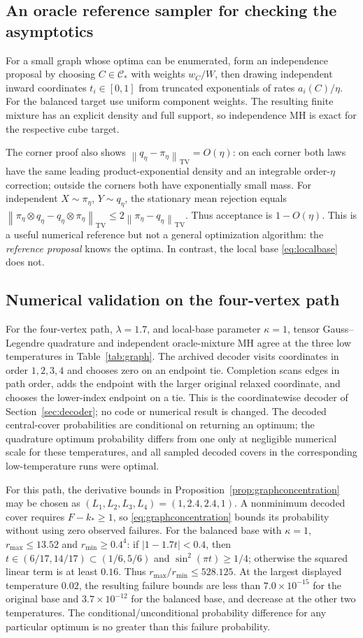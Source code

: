 \documentclass[11pt]{article}
\theoremstyle{definition}\newtheorem{definition}[theorem]{Definition}
\theoremstyle{remark}\newtheorem{remark}[theorem]{Remark}
\numberwithin{equation}{section}
\newcommand{\norm}[1]{\left\lVert#1\right\rVert}\newcommand{\TV}{\mathrm{TV}}
\newcommand{\1}{\mathbf 1}
\begin{document}
\subsection{An oracle reference sampler for checking the asymptotics}
For a small graph whose optima can be enumerated, form an independence proposal by choosing $C\in\mathcal C_*$ with weights $w_C/W$, then drawing independent inward coordinates $t_i\in[0,1]$ from truncated exponentials of rates $a_i(C)/\eta$. For the balanced target use uniform component weights. The resulting finite mixture has an explicit density and full support, so independence MH is exact for the respective cube target.

The corner proof also shows $\norm{q_\eta-\pi_\eta}_{\TV}=O(\eta)$: on each corner both laws have the same leading product-exponential density and an integrable order-$\eta$ correction; outside the corners both have exponentially small mass. For independent $X\sim\pi_\eta$, $Y\sim q_\eta$, the stationary mean rejection equals
$\norm{\pi_\eta\otimes q_\eta-q_\eta\otimes\pi_\eta}_{\TV}\le2\norm{\pi_\eta-q_\eta}_{\TV}$.
Thus acceptance is $1-O(\eta)$. This is a useful numerical reference but not a general optimization algorithm: the \emph{reference proposal} knows the optima. In contrast, the local base \eqref{eq:localbase} does not.


\subsection{Numerical validation on the four-vertex path}
For the four-vertex path, $\lambda=1.7$, and local-base parameter $\kappa=1$, tensor Gauss--Legendre quadrature and independent oracle-mixture MH agree at the three low temperatures in Table~\ref{tab:graph}. The archived decoder visits coordinates in order $1,2,3,4$ and chooses zero on an endpoint tie. Completion scans edges in path order, adds the endpoint with the larger original relaxed coordinate, and chooses the lower-index endpoint on a tie. This is the coordinatewise decoder of Section~\ref{sec:decoder}; no code or numerical result is changed. The decoded central-cover probabilities are conditional on returning an optimum; the quadrature optimum probability differs from one only at negligible numerical scale for these temperatures, and all sampled decoded covers in the corresponding low-temperature runs were optimal.

For this path, the derivative bounds in Proposition~\ref{prop:graphconcentration} may be chosen as $(L_1,L_2,L_3,L_4)=(1,2.4,2.4,1)$. A nonminimum decoded cover requires $F-k_*\ge1$, so \eqref{eq:graphconcentration} bounds its probability without using zero observed failures. For the balanced base with $\kappa=1$, $r_{\max}\le13.52$ and $r_{\min}\ge0.4^4$: if $|1-1.7t|<0.4$, then $t\in(6/17,14/17)\subset(1/6,5/6)$ and $\sin^2(\pi t)\ge1/4$; otherwise the squared linear term is at least $0.16$. Thus $r_{\max}/r_{\min}\le528.125$. At the largest displayed temperature $0.02$, the resulting failure bounds are less than $7.0\times10^{-15}$ for the original base and $3.7\times10^{-12}$ for the balanced base, and decrease at the other two temperatures. The conditional/unconditional probability difference for any particular optimum is no greater than this failure probability.
\end{document}
